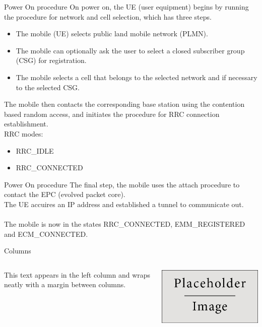 \documentclass{beamer}
\begin{document}
\begin{frame}{Power On procedure}
On power on, the UE (user equipment) begins by running the procedure for network and cell selection, which has three steps.
    \begin{itemize}
        \item The mobile (UE) selects public land mobile network (PLMN).
        \item  The mobile can optionally ask the user to select a closed subscriber group (CSG) for registration. 
        \item The mobile selects a cell that belongs to the selected network and if necessary to the selected CSG.
    \end{itemize}
The mobile then contacts the corresponding base station using the contention based random access, and initiates the procedure for RRC connection establishment.
\\ RRC modes:
\begin{itemize}
    \item RRC\_IDLE 
    \item RRC\_CONNECTED
\end{itemize}
\end{frame}
\begin{frame}{Power On procedure}
    The final step, the mobile uses the attach procedure to contact the EPC (evolved packet core).\\ The UE accuires an IP address and established a tunnel to communicate out.
    \\\\
    
    The mobile is now in the states RRC\_CONNECTED, EMM\_REGISTERED and ECM\_CONNECTED. 
\end{frame}

\begin{frame}{Columns}
	\begin{columns}
			This text appears in the left column and wraps neatly with a margin between columns.
		
			\includegraphics[width=\linewidth]{Images/placeholder.jpg}
	\end{columns}
\end{frame}
\end{document}
